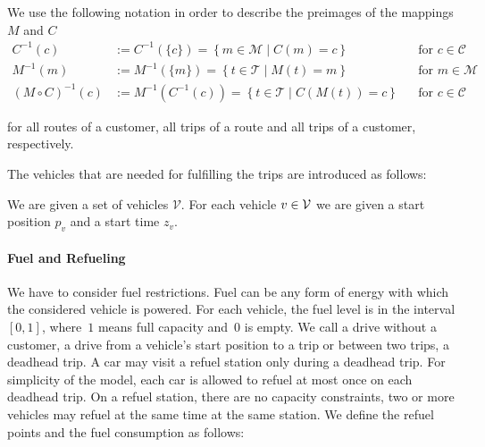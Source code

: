 We use the following notation in order to describe the preimages of the mappings $M$ and $C$
\begin{align*}
	C^{-1}(c) & := C^{-1}\left(\{c\}\right) = \left\{m\in\mathcal{M}\mid C(m)=c\right\} && \text{for } c\in\mathcal{C} \\
	M^{-1}(m) & := M^{-1}\left(\{m\}\right) = \left\{t\in\mathcal{T}\mid M(t)=m\right\} && \text{for } m\in\mathcal{M} \\
	\left(M\circ C\right)^{-1}(c) & := M^{-1}\left(C^{-1}(c)\right) = \left\{t\in\mathcal{T}\mid C\left(M(t)\right)=c\right\} && \text{for } c\in\mathcal{C}
\end{align*}

for all routes of a customer, all trips of a route and all trips of a customer, respectively.

The vehicles that are needed for fulfilling the trips are introduced as follows:

\begin{definition}[Vehicles]

We are given a set of vehicles $\mathcal{V}$. For each vehicle $v\in\mathcal{V}$ we are given a start position $p_v$ and a start time $z_v$.

\end{definition}

\paragraph{Fuel and Refueling} \parfill

We have to consider fuel restrictions. Fuel can be any form of energy with which the considered vehicle is powered. For each vehicle, the fuel level is in the interval $[0,1]$, where~$1$ means full capacity and~$0$ is empty. We call a drive without a customer, \ie a drive from a vehicle's start position to a trip or between two trips, a deadhead trip. A car may visit a refuel station only during a deadhead trip. For simplicity of the model, each car is allowed to refuel at most once on each deadhead trip. On a refuel station, there are no capacity constraints, \ie two or more vehicles may refuel at the same time at the same station. We define the refuel points and the fuel consumption as follows:

